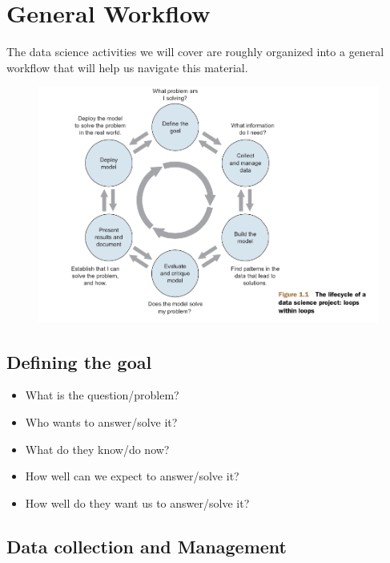 \documentclass[12pt,]{book}
\providecommand{\tightlist}{%
  \setlength{\itemsep}{0pt}\setlength{\parskip}{0pt}}
\theoremstyle{definition}
\theoremstyle{definition}
\theoremstyle{remark}
\begin{document}
\section{General Workflow}\label{general-workflow}

The data science activities we will cover are roughly organized into a
general workflow that will help us navigate this material.

\begin{figure}
\centering
\includegraphics{img/zumel_mount_cycle.png}
\caption{}
\end{figure}

\subsection{Defining the goal}\label{defining-the-goal}

\begin{itemize}
\tightlist
\item
  What is the question/problem?
\item
  Who wants to answer/solve it?
\item
  What do they know/do now?
\item
  How well can we expect to answer/solve it?
\item
  How well do they want us to answer/solve it?
\end{itemize}

\subsection{Data collection and
Management}\label{data-collection-and-management}
\end{document}
